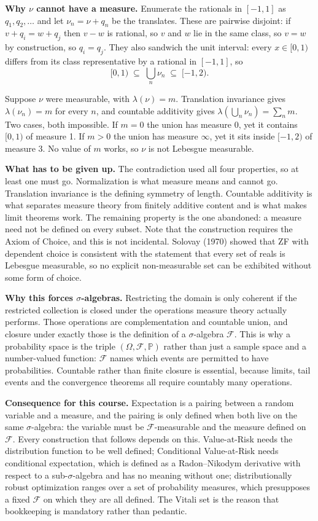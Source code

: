 \documentclass[11pt]{article}
\begin{document}
\textbf{Why $\nu$ cannot have a measure.}\quad
Enumerate the rationals in $[-1,1]$ as $q_1, q_2, \dots$ and let
$\nu_n = \nu + q_n$ be the translates. These are pairwise disjoint: if
$v + q_i = w + q_j$ then $v - w$ is rational, so $v$ and $w$ lie in the
same class, so $v = w$ by construction, so $q_i = q_j$. They also
sandwich the unit interval: every $x \in [0,1)$ differs from its class
representative by a rational in $[-1,1]$, so
\[
  [0,1) \;\subseteq\; \bigcup_{n} \nu_n \;\subseteq\; [-1,2).
\]

Suppose $\nu$ were measurable, with $\lambda(\nu) = m$. Translation
invariance gives $\lambda(\nu_n) = m$ for every $n$, and countable
additivity gives $\lambda(\bigcup_n \nu_n) = \sum_n m$. Two cases, both
impossible. If $m = 0$ the union has measure 0, yet it contains $[0,1)$
of measure 1. If $m > 0$ the union has measure $\infty$, yet it sits
inside $[-1,2)$ of measure 3. No value of $m$ works, so $\nu$ is not
Lebesgue measurable.

\textbf{What has to be given up.}\quad
The contradiction used all four properties, so at least one must go.
Normalization is what measure means and cannot go. Translation
invariance is the defining symmetry of length. Countable additivity is
what separates measure theory from finitely additive content and is what
makes limit theorems work. The remaining property is the one abandoned:
a measure need not be defined on every subset. Note that the
construction requires the Axiom of Choice, and this is not incidental.
Solovay (1970) showed that ZF with dependent choice is consistent with
the statement that every set of reals is Lebesgue measurable, so no
explicit non-measurable set can be exhibited without some form of
choice.

\textbf{Why this forces $\sigma$-algebras.}\quad
Restricting the domain is only coherent if the restricted collection is
closed under the operations measure theory actually performs. Those
operations are complementation and countable union, and closure under
exactly those is the definition of a $\sigma$-algebra $\mathcal{F}$.
This is why a probability space is the triple
$(\Omega, \mathcal{F}, \mathbb{P})$ rather than just a sample space and a
number-valued function: $\mathcal{F}$ names which events are permitted
to have probabilities. Countable rather than finite closure is
essential, because limits, tail events and the convergence theorems all
require countably many operations.

\textbf{Consequence for this course.}\quad
Expectation is a pairing between a random variable and a measure, and
the pairing is only defined when both live on the same
$\sigma$-algebra: the variable must be $\mathcal{F}$-measurable and the
measure defined on $\mathcal{F}$. Every construction that follows
depends on this. Value-at-Risk needs the distribution function to be
well defined; Conditional Value-at-Risk needs conditional expectation,
which is defined as a Radon--Nikodym derivative with respect to a
sub-$\sigma$-algebra and has no meaning without one; distributionally
robust optimization ranges over a set of probability measures, which
presupposes a fixed $\mathcal{F}$ on which they are all defined. The
Vitali set is the reason that bookkeeping is mandatory rather than
pedantic.
\end{document}

